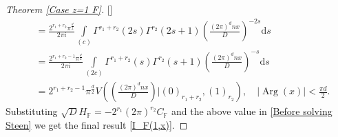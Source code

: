 \documentclass[12pt,reqno]{amsart}
\newcommand{\Arg}{\operatorname{Arg}}
\renewcommand{\(}{\left\(}
\renewcommand{\)}{\right\)}
\renewcommand{\[}{\left\[}
\renewcommand{\]}{\right\]}
\numberwithin{equation}{section}
\theoremstyle{plain}
\begin{document}
\begin{proof}[Theorem \rm{\ref{Case z=1 F}}][]
\begin{align}
&= \frac{2^{r_1+r_2}\pi^{\frac{d}{2}}}{2\pi i}\int\limits_{(c)}\Gamma^{r_1+r_2}(2s)\Gamma^{r_2}(2s+1)\left(\frac{(2\pi)^{d} n x}{D}\right)^{-2s} \textrm{d}s \nonumber \\
&= \frac{2^{r_1+r_2-1}\pi^{\frac{d}{2}}}{2\pi i}\int\limits_{(2c)}\Gamma^{r_1+r_2}(s)\Gamma^{r_2}(s+1)\left(\frac{(2\pi)^{d} n x}{D}\right)^{-s} \textrm{d}s \nonumber \\
&= 2^{r_1+r_2-1}\pi^{\frac{d}{2}}V\left(\left(\frac{(2\pi)^{d} n x}{D}\right)\bigg|\left(0\right)_{r_1 + r_2}, (1)_{r_2}\right), \quad |\Arg(x)|<\frac{\pi d}{2}.
\end{align}
Substituting $\sqrt{D}H_{\mathbb{F}} = -2^{r_1}(2\pi)^{r_2}C_{\mathbb{F}}$ and the above value in \eqref{Before solving Steen} we get the final result \eqref{I_F(1,x)}.
\end{proof}

\end{document}
